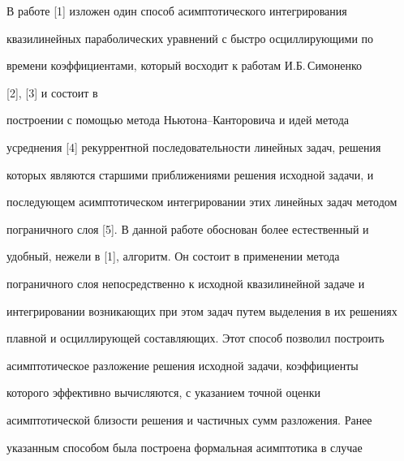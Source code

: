  


\date{} 




\pagestyle{plain} %


 




\maketitle 


\label{begin} 


 


 


В работе [1] изложен один способ асимптотического интегрирования 


квазилинейных параболических уравнений с быстро осциллирующими по 


времени коэффициентами, который восходит к работам И.Б.\,Симоненко


[2], [3] и состоит в 


построении с помощью метода Ньютона--Канторовича и идей метода 


усреднения [4] рекуррентной последовательности линейных задач, решения 


которых являются старшими приближениями решения исходной задачи, и 


последующем асимптотическом интегрировании этих линейных задач методом 


пограничного слоя [5]. В данной работе обоснован более естественный и 


удобный, нежели в [1], алгоритм. Он состоит в применении метода 


пограничного слоя непосредственно к исходной квазилинейной задаче и 


интегрировании возникающих при этом задач путем выделения в их решениях 


плавной и осциллирующей составляющих. Этот способ позволил построить 


асимптотическое разложение решения исходной задачи, коэффициенты 


которого эффективно вычисляются, с указанием точной оценки 


асимптотической близости решения и частичных сумм разложения. Ранее 


указанным способом была построена формальная асимптотика в случае 


